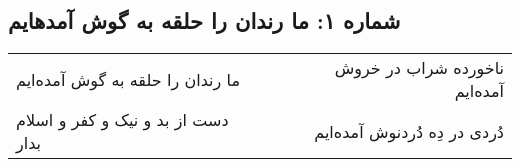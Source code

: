 \begin{center}
\section*{شماره ۱: ما رندان را حلقه به گوش آمدهایم}
\label{sec:001}
\begin{longtable}{l p{0.5cm} r}
ما رندان را حلقه به گوش آمده‌ایم
&&
ناخورده شراب در خروش آمده‌ایم
\\
دست از بد و نیک و کفر و اسلام بدار
&&
دُردی در دِه دُردنوش آمده‌ایم
\\
\end{longtable}
\end{center}
